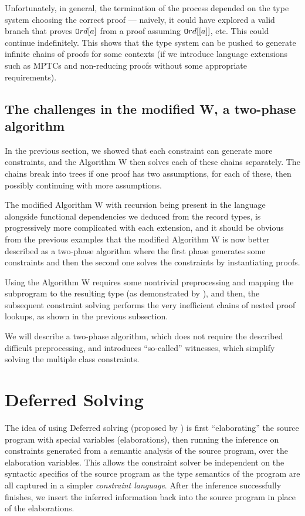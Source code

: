 Unfortunately, in general, the termination of the process depended on the type system choosing the correct proof --- naively, it could have explored a valid branch that proves $\mathtt{O}rd [a]$ from a proof assuming $\mathtt{O}rd [[a]]$, etc. This could continue indefinitely. This shows that the type system can be pushed to generate infinite chains of proofs for some contexts (if we introduce language extensions such as MPTCs and non-reducing proofs without some appropriate requirements).

\subsection{The challenges in the modified W, a two-phase algorithm}

In the previous section, we showed that each constraint can generate more constraints, and the Algorithm W then solves each of these chains separately. The chains break into trees if one proof has two assumptions, for each of these, then possibly continuing with more assumptions.

The modified Algorithm W with recursion being present in the language alongside functional dependencies we deduced from the record types, is progressively more complicated with each extension, and it should be obvious from the previous examples that the modified Algorithm W is now better described as a two-phase algorithm where the first phase generates some constraints and then the second one solves the constraints by instantiating proofs.

Using the Algorithm W requires some nontrivial preprocessing and mapping the subprogram to the resulting type (as demonstrated by \citet{jones1999typing}), and then, the subsequent constraint solving performs the very inefficient chains of nested proof lookups, as shown in the previous subsection.

We will describe a two-phase algorithm, which does not require the described difficult preprocessing, and introduces ``so-called'' witnesses, which simplify solving the multiple class constraints.

\section{Deferred Solving}
\label{defer_solve}

The idea of using Deferred solving (proposed by \citet{vytiniotis2011outsidein}) is first ``elaborating'' the source program with special variables (elaborations), then running the inference on constraints generated from a semantic analysis of the source program, over the elaboration variables. This allows the constraint solver be independent on the syntactic specifics of the source program as the type semantics of the program are all captured in a simpler \emph{constraint language}. After the inference successfully finishes, we insert the inferred information back into the source program in place of the elaborations.


